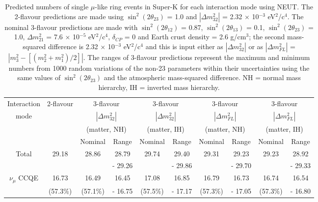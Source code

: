\begin{table}
\caption[Predicted numbers of single $\mu$-like ring events in Super-K for each interaction mode using NEUT]
{Predicted numbers of single $\mu$-like ring events in Super-K for each interaction mode using NEUT. The 2-flavour predictions are made using
$\sin^{2}(2 \theta_{23})$ = 1.0 and $|\Delta m_{32}^{2}|$ = 2.32 $\times$ 10$^{-3}$ eV$^{2}$/c$^{4}$. The nominal 3-flavour predictions are made with
$\sin^{2}(2 \theta_{12})$ = 0.87, $\sin^{2}(2 \theta_{13})$ = 0.1, $\sin^{2}(2 \theta_{23})$ = 1.0, $\Delta m_{21}^{2}$ = 7.6 $\times$ 10$^{-5}$ eV$^{2}$/c$^{4}$,
$\delta_{CP}$ = 0 and Earth crust density = 2.6 g/cm$^{3}$; the second mass-squared difference is 2.32 $\times$ 10$^{-3}$ eV$^{2}$/c$^{4}$ and this is input either
as $|\Delta m_{32}^{2}|$ or as $|\Delta m_{FL}^{2}|$ = $|m_{3}^{2} - [(m_{2}^{2} + m_{1}^{2}) / 2]|$. The ranges of 3-flavour predictions represent the
maximum and minimum numbers from 1000 random variations of the non-23 parameters within their uncertainties using the same values of $\sin^{2}(2 \theta_{23})$
and the atmospheric mass-squared difference. NH = normal mass hierarchy, IH = inverted mass hierarchy.}
\renewcommand{\tabcolsep}{3.5pt}
\centering
\begin{tabular}{| c | c | c | c | c | c | c | c | c | c |}
\hline
Interaction &  2-flavour & \multicolumn{2}{|c|}{3-flavour} & \multicolumn{2}{|c|}{3-flavour} & \multicolumn{2}{|c|}{3-flavour} & \multicolumn{2}{|c|}{3-flavour} \\
mode &  & \multicolumn{2}{|c|}{$|\Delta m_{32}^{2}|$} & \multicolumn{2}{|c|}{$|\Delta m_{32}^{2}|$} & \multicolumn{2}{|c|}{$|\Delta m_{FL}^{2}|$} & \multicolumn{2}{|c|}{$|\Delta m_{FL}^{2}|$} \\
 &  & \multicolumn{2}{|c|}{(matter, NH)} & \multicolumn{2}{|c|}{(matter, IH)} & \multicolumn{2}{|c|}{(matter, NH)} & \multicolumn{2}{|c|}{(matter, IH)} \\
\hline
 &   & Nominal & Range & Nominal & Range & Nominal & Range & Nominal & Range \\
\hline
Total & 29.18 & 28.86  & 28.79 &  29.74 & 29.40 & 29.31 & 29.23 & 29.23 & 28.92 \\
 &  &   & - 29.26  &   & - 29.86 & & - 29.70 &  & - 29.33 \\
\hline
$\nu_{\mu}$ CCQE & 16.73 & 16.49 & 16.45 & 17.08 & 16.85 & 16.79 & 16.73 & 16.74 & 16.54 \\
 &(57.3\%) &  (57.1\%) & - 16.75 & (57.5\%) & - 17.17 & (57.3\%) & - 17.05 & (57.3\%) & - 16.80 \\

\end{tabular}
\end{table}

